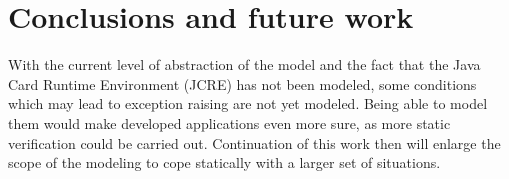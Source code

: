 \documentclass{entcs}
\begin{document}
\section{Conclusions and future work}

With the current level of abstraction of the model and the fact that
the Java Card Runtime Environment (JCRE) has not been modeled, some
conditions which may lead to exception raising are not yet
modeled. Being able to model them would make developed applications
even more sure, as more static verification could be carried
out. Continuation of this work then will enlarge the scope of the
modeling to cope statically with a larger set of situations.




\end{document}
